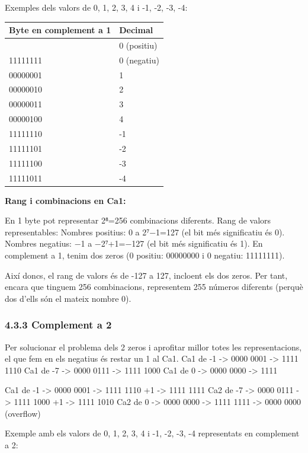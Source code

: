 \documentclass[
  12 pt,
  a4paper,
]{article}
\begin{document}
Exemples dels valors de 0, 1, 2, 3, 4 i -1, -2, -3, -4:

\begin{longtable}[]{@{}ll@{}}
\toprule\noalign{}
Byte en complement a 1 & Decimal \\
\midrule\noalign{}
\endhead
\bottomrule\noalign{}
\endlastfoot
00000000 & 0 (positiu) \\
11111111 & 0 (negatiu) \\
00000001 & 1 \\
00000010 & 2 \\
00000011 & 3 \\
00000100 & 4 \\
11111110 & -1 \\
11111101 & -2 \\
11111100 & -3 \\
11111011 & -4 \\
\end{longtable}

\textbf{Rang i combinacions en Ca1:}

En 1 byte pot representar 2⁸=256 combinacions diferents. Rang de valors
representables: Nombres positius: 0 a 2⁷−1=127 (el bit més significatiu
és 0). Nombres negatius: −1 a −2⁷+1=−127 (el bit més significatiu és 1).
En complement a 1, tenim dos zeros (0 positiu: 00000000 i 0 negatiu:
11111111).

Així doncs, el rang de valors és de -127 a 127, incloent els dos zeros.
Per tant, encara que tinguem 256 combinacions, representem 255 números
diferents (perquè dos d'ells són el mateix nombre 0).

\subsubsection{4.3.3 Complement a 2}\label{complement-a-2}

Per solucionar el problema dels 2 zeros i aprofitar millor totes les
representacions, el que fem en els negatius és restar un 1 al Ca1. Ca1
de -1 -\textgreater{} 0000 0001 -\textgreater{} 1111 1110 Ca1 de -7
-\textgreater{} 0000 0111 -\textgreater{} 1111 1000 Ca1 de 0
-\textgreater{} 0000 0000 -\textgreater{} 1111

Ca1 de -1 -\textgreater{} 0000 0001 -\textgreater{} 1111 1110 +1
-\textgreater{} 1111 1111 Ca2 de -7 -\textgreater{} 0000 0111
-\textgreater{} 1111 1000 +1 -\textgreater{} 1111 1010 Ca2 de 0
-\textgreater{} 0000 0000 -\textgreater{} 1111 1111 -\textgreater{} 0000
0000 (overflow)

Exemple amb els valors de 0, 1, 2, 3, 4 i -1, -2, -3, -4 representats en
complement a 2:
\end{document}
